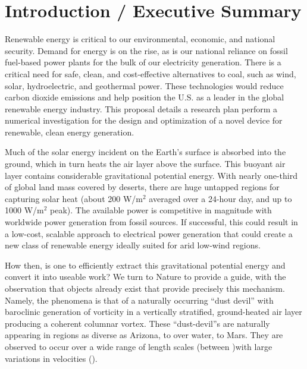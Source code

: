 \section{Introduction / Executive Summary}

Renewable energy is critical to our environmental, economic, and
national security. Demand for energy is on the rise, as is our national
reliance on fossil fuel-based power plants for the bulk of our
electricity generation. There is a critical need for safe, clean, and
cost-effective alternatives to coal, such as wind, solar, hydroelectric,
and geothermal power\cite{arpa-e}. These technologies would reduce carbon dioxide
emissions and help position the U.S. as a leader in the global renewable
energy industry. 
%
%
This proposal details a research plan perform a numerical investigation
for the design and optimization of a novel device for renewable, clean
energy generation. 

Much of the solar energy incident on the Earth's surface is absorbed
into the ground, which in turn heats the air layer above the surface.
This buoyant air layer contains considerable gravitational potential
energy. 
With nearly one-third of global land mass covered by deserts, there are huge
untapped regions for capturing solar heat (about 200 W/$\text{m}^2$ averaged over
a 24-hour day, and up to 1000 W/$\text{m}^2$ peak).  The available power is
competitive in magnitude with worldwide power generation from fossil
sources. If successful, this could result in a low-cost, scalable
approach to electrical power generation that could create a new class of
renewable energy ideally suited for arid low-wind regions. 

How then, is one to efficiently extract this gravitational potential
energy and convert it into useable work? We turn to Nature to provide a 
guide, with the observation that objects already
exist that provide precisely this mechanism. Namely, the phenomena is
that of a naturally 
%
%
occurring ``dust devil'' with baroclinic generation of vorticity in a
vertically stratified, ground-heated air layer producing a coherent
columnar vortex. These ``dust-devil''s are naturally appearing in
regions as diverse as Arizona, to over water, to Mars. They are observed
to occur over a wide range of length scales (between )with large variations in
velocities ()\cite{sinclair}. 

